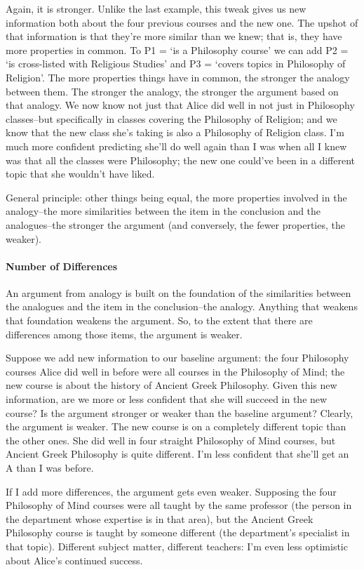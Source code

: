 Again, it is stronger. Unlike the last example, this tweak gives us new information both about the
four previous courses and the new one. The upshot of that information is that they're more similar
than we knew; that is, they have more properties in common. To P1 = `is a Philosophy course' we
can add P2 = `is cross-listed with Religious Studies' and P3 = `covers topics in Philosophy of
Religion'. The more properties things have in common, the stronger the analogy between them.
The stronger the analogy, the stronger the argument based on that analogy. We now know not just
that Alice did well in not just in Philosophy classes--but specifically in classes covering the
Philosophy of Religion; and we know that the new class she's taking is also a Philosophy of
Religion class. I'm much more confident predicting she'll do well again than I was when all I knew
was that all the classes were Philosophy; the new one could've been in a different topic that she
wouldn't have liked.

General principle: other things being equal, the more properties involved in the analogy--the more
similarities between the item in the conclusion and the analogues--the stronger the argument (and
conversely, the fewer properties, the weaker).

\paragraph{Number of Differences}

An argument from analogy is built on the foundation of the similarities between the analogues and
the item in the conclusion--the analogy. Anything that weakens that foundation weakens the
argument. So, to the extent that there are differences among those items, the argument is weaker.

Suppose we add new information to our baseline argument: the four Philosophy courses Alice did
well in before were all courses in the Philosophy of Mind; the new course is about the history of
Ancient Greek Philosophy. Given this new information, are we more or less confident that she will
succeed in the new course? Is the argument stronger or weaker than the baseline argument?
Clearly, the argument is weaker. The new course is on a completely different topic than the other
ones. She did well in four straight Philosophy of Mind courses, but Ancient Greek Philosophy is
quite different. I'm less confident that she'll get an A than I was before.

If I add more differences, the argument gets even weaker. Supposing the four Philosophy of Mind
courses were all taught by the same professor (the person in the department whose expertise is in
that area), but the Ancient Greek Philosophy course is taught by someone different (the
department's specialist in that topic). Different subject matter, different teachers: I'm even less
optimistic about Alice's continued success.

